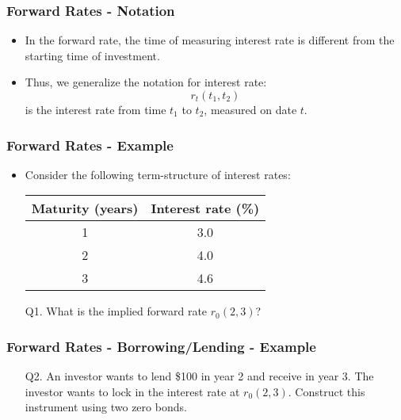 \documentclass[10pt]{beamer}
\begin{document}
\begin{frame}
	\frametitle{Forward Rates - Notation}
	\begin{itemize} \itemsep20pt
		\item In the forward rate, the time of measuring interest rate is different from the starting time of investment.
		\item Thus, we generalize the notation for interest rate:
		$$
			r_t(t_1,t_2)
		$$
		is the interest rate from time $t_1$ to $t_2$, measured on date $t$.		
	\end{itemize}
\end{frame}




\begin{frame}[t]
	\frametitle{Forward Rates - Example}
	\begin{itemize} \itemsep15pt
		\item  Consider the following term-structure of interest rates:
		\begin{center}
			\begin{tabular}{cc}
			\hline
			Maturity (years) & Interest rate (\%) \\
			\hline
			1 & 3.0 \\
			2 & 4.0 \\
			3 & 4.6 \\
			\hline
			\end{tabular}
		\end{center}	
		\item[Q1.] What is the implied forward rate $r_0(2,3)$?		
	\end{itemize}
\end{frame}


\begin{frame}[t]
	\frametitle{Forward Rates - Borrowing/Lending - Example}
	\begin{itemize} \itemsep15pt
		\item[Q2.] An investor wants to lend \$100 in year 2 and receive in year 3. The investor wants to lock in the interest rate at $r_0(2,3)$. Construct this instrument using two zero bonds.
	\end{itemize}
\end{frame}
\end{document}
